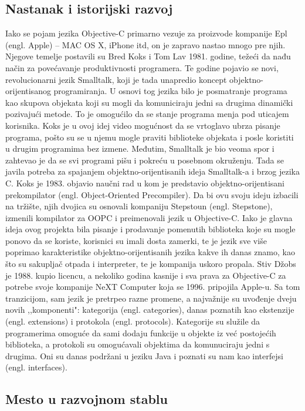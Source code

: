 \documentclass[a4paper]{article}
\begin{document}
\subsection{Nastanak i istorijski razvoj}
\label{subsec:istorija}
Iako se pojam jezika Objective-C primarno vezuje za proizvode kompanije Epl (engl. Apple) -- MAC OS X, iPhone itd, on je zapravo nastao mnogo pre njih. Njegove temelje postavili su Bred Koks i Tom Lav 1981. godine, težeći da nađu način za povećavanje produktivnosti programera. Te godine pojavio se novi, revolucionarni jezik Smalltalk, koji je tada unapredio koncept objektno-orijentisanog programiranja. U osnovi tog jezika bilo je posmatranje programa kao skupova objekata koji su mogli da komuniciraju jedni sa drugima dinamički pozivajući metode. To je omogućilo da se stanje programa menja pod uticajem korisnika. Koks je u ovoj idej video mogućnost da se vrtoglavo ubrza pisanje programa, pošto su se u njemu mogle praviti biblioteke objekata i posle koristiti u drugim programima bez izmene. Međutim, Smalltalk je bio veoma spor i zahtevao je da se svi programi pišu i pokreću u posebnom okruženju. Tada se javila potreba za spajanjem objektno-orijentisanih ideja Smalltalk-a i brzog jezika C. Koks je 1983. objavio naučni rad u kom je predstavio objektno-orijentisani prekompilator (engl. Object-Oriented Precompiler). Da bi ovu svoju ideju izbacili na tržište, njih dvojica su osnovali kompaniju Stepstoun (engl. Stepstone), izmenili kompilator za OOPC i preimenovali jezik u Objective-C. Iako je glavna ideja ovog projekta bila pisanje i prodavanje pomenutih biblioteka koje su mogle ponovo da se koriste, korisnici su imali dosta zamerki, te je jezik sve više poprimao karakteristike objektno-orijentisanih jezika kakve ih danas znamo, kao što su sakupljač otpada i interpreter, te je kompanija uskoro propala. Stiv Džobs je 1988. kupio licencu, a nekoliko godina kasnije i sva prava za Objective-C za potrebe svoje kompanije NeXT Computer koja se  1996. pripojila Apple-u. Sa tom tranzicijom, sam jezik je pretrpeo razne promene, a najvažnije su uvođenje dveju novih ,,komponenti": kategorija (engl. categories), danas poznatih kao ekstenzije (engl. extensions) i protokola (engl. protocols). Kategorije su služile da programerima omoguće da sami dodaju funkcije u objekte iz već postojećih biblioteka, a protokoli su omogućavali objektima da komunuciraju jedni s drugima. Oni su danas podržani u jeziku Java i poznati su nam kao interfejsi (engl. interfaces). 

\subsection{Mesto u razvojnom stablu}
\label{subsec:stablo}
\end{document}
